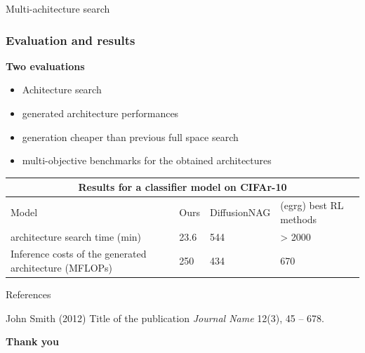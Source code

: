 \documentclass[aspectratio=169,xcolor=dvipsnames]{beamer}
\begin{document}
\begin{frame}{Multi-achitecture search}
        
    \frametitle{Evaluation and results}
        \textbf{Two evaluations}
        \begin{itemize}
            \item Achitecture search 
            \item generated architecture performances
        \end{itemize}
        
        \begin{itemize}
            \item generation cheaper than previous full space search
            \item multi-objective benchmarks for the obtained architectures
        \end{itemize}


        \begin{tabular}{ |p{3cm}||p{3cm}|p{3cm}|p{3cm}|  }
            \hline
            \multicolumn{4}{|c|}{Results for a classifier model on CIFAr-10} \\
            \hline
            Model& Ours & DiffusionNAG & (egrg) best RL methods\\
            \hline
            architecture search time (min) & 23.6 & 544 & > 2000 \\
            Inference costs of the generated architecture (MFLOPs) & 250 & 434 & 670\\
            \hline
        \end{tabular}

\end{frame}



\begin{frame}{References}
    \footnotesize{
        \begin{thebibliography}{99}
             John Smith (2012)
            \newblock Title of the publication
            \newblock \emph{Journal Name} 12(3), 45 -- 678.
        \end{thebibliography}
    }
\end{frame}


\begin{frame}
    \Huge{\centerline{\textbf{Thank you}}}
\end{frame}

\end{document}
